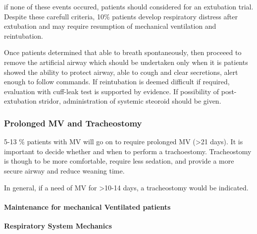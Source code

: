 \documentclass[
  letterpaper,
  DIV=11,
  numbers=noendperiod]{scrreprt}
\let\oldparagraph\paragraph
\renewcommand{\paragraph}[1]{\oldparagraph{#1}\mbox{}}
\begin{document}
if none of these events occured, patients should considered for an
extubation trial. Despite these carefull criteria, 10\% patients develop
respiratory distress after extubation and may require resumption of
mechanical ventilation and reintubation.

Once patients determined that able to breath spontaneously, then
proceeed to remove the artificial airway which should be undertaken only
when it is patients showed the ability to protect airway, able to cough
and clear secretions, alert enough to follow commands. If reintubation
is deemed difficult if required, evaluation with cuff-leak test is
supported by evidence. If possibility of post-extubation stridor,
administration of systemic steoroid should be given.

\subsubsection{Prolonged MV and
Tracheostomy}\label{prolonged-mv-and-tracheostomy}

5-13 \% patients with MV will go on to require prolonged MV
(\textgreater21 days). It is important to decide whether and when to
perform a trachoestomy. Tracheostomy is though to be more comfortable,
require less sedation, and provide a more secure airway and reduce
weaning time.

In general, if a need of MV for \textgreater10-14 days, a tracheostomy
would be indicated.

\paragraph{Maintenance for mechanical Ventilated
patients}\label{maintenance-for-mechanical-ventilated-patients-1}

\textbf{Respiratory System Mechanics}
\end{document}
